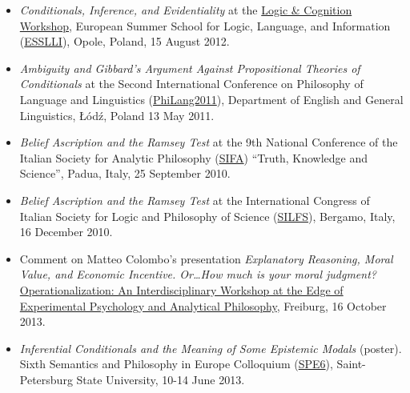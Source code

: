\documentclass[a4paper,12pt]{article}
\begin{document}
\begin{small}
\begin{itemize}
    \item \emph{Conditionals, Inference, and Evidentiality} at the \href{http://www.ai.rug.nl/SocialCognition/logic-cognition/}{Logic \& Cognition Workshop}, European Summer School for Logic, Language, and Information (\href{http://www.esslli2012.pl}{ESSLLI}), Opole, Poland, 15 August 2012. 

    \item \emph{Ambiguity and Gibbard's Argument Against Propositional Theories of Conditionals} at the Second International Conference on Philosophy of Language and Linguistics (\href{http://ia.uni.lodz.pl/linguistics/events/philang-2011}{PhiLang2011}),  Department of English and General Linguistics, Łódź, Poland
    13 May 2011. 

    \item \emph{Belief Ascription and the Ramsey Test} at the 9th National Conference of the Italian Society for Analytic Philosophy (\href{http://www.filosofia.lettere.unipd.it/analitica/sifa2010/}{SIFA}) ``Truth, Knowledge and Science'', Padua, Italy, 25 September 2010. 
  
    \item \emph{Belief Ascription and the Ramsey Test} at the International Congress of Italian Society for Logic and Philosophy of Science (\href{http://dinamico2.unibg.it/silfs/convegno2010.htm}{SILFS}), Bergamo, Italy, 16 December 2010. 
  \end{itemize}
  

  \begin{itemize}

  \item Comment on Matteo Colombo's presentation \emph{Explanatory Reasoning, Moral Value, and Economic Incentive. Or\ldots How much is your moral judgment?} 
    \href{http://www.psychologie.uni-freiburg.de/Members/singmann/operational2013}{Operationalization: An Interdisciplinary Workshop at the Edge of Experimental Psychology and Analytical Philosophy}, Freiburg, 16 October 2013.

  \item \emph{Inferential Conditionals and the Meaning of Some
      Epistemic Modals} (poster). Sixth Semantics and Philosophy
    in Europe Colloquium
    (\href{http://spe6conference.wordpress.com}{SPE6}),
    Saint-Petersburg State University, 10-14 June 2013.
    

\end{itemize}
\end{small}
\end{document}
